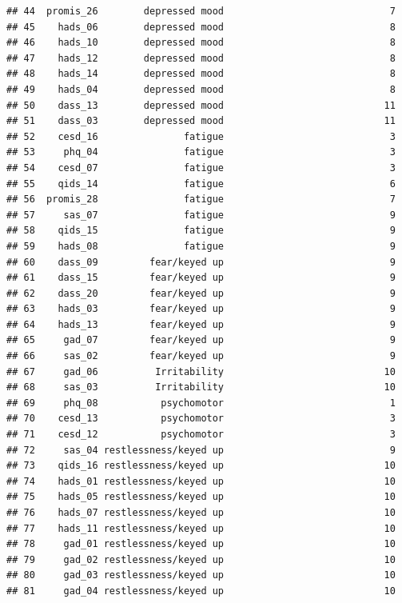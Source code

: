 \documentclass[
]{article}
\begin{document}
\begin{verbatim}
## 44  promis_26        depressed mood                             7
## 45    hads_06        depressed mood                             8
## 46    hads_10        depressed mood                             8
## 47    hads_12        depressed mood                             8
## 48    hads_14        depressed mood                             8
## 49    hads_04        depressed mood                             8
## 50    dass_13        depressed mood                            11
## 51    dass_03        depressed mood                            11
## 52    cesd_16               fatigue                             3
## 53     phq_04               fatigue                             3
## 54    cesd_07               fatigue                             3
## 55    qids_14               fatigue                             6
## 56  promis_28               fatigue                             7
## 57     sas_07               fatigue                             9
## 58    qids_15               fatigue                             9
## 59    hads_08               fatigue                             9
## 60    dass_09         fear/keyed up                             9
## 61    dass_15         fear/keyed up                             9
## 62    dass_20         fear/keyed up                             9
## 63    hads_03         fear/keyed up                             9
## 64    hads_13         fear/keyed up                             9
## 65     gad_07         fear/keyed up                             9
## 66     sas_02         fear/keyed up                             9
## 67     gad_06          Irritability                            10
## 68     sas_03          Irritability                            10
## 69     phq_08           psychomotor                             1
## 70    cesd_13           psychomotor                             3
## 71    cesd_12           psychomotor                             3
## 72     sas_04 restlessness/keyed up                             9
## 73    qids_16 restlessness/keyed up                            10
## 74    hads_01 restlessness/keyed up                            10
## 75    hads_05 restlessness/keyed up                            10
## 76    hads_07 restlessness/keyed up                            10
## 77    hads_11 restlessness/keyed up                            10
## 78     gad_01 restlessness/keyed up                            10
## 79     gad_02 restlessness/keyed up                            10
## 80     gad_03 restlessness/keyed up                            10
## 81     gad_04 restlessness/keyed up                            10

\end{verbatim}
\end{document}
